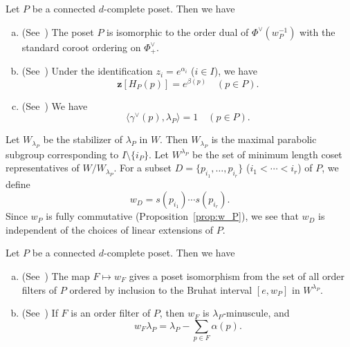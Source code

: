 \documentclass[ALCO,ThmDefs,Unicode,epreuves]{cedram}
\newcommand\vectz{\boldsymbol{z}}
\begin{document}
\begin{prop}
\label{prop:root}
Let $P$ be a connected $d$-complete poset. Then we have
\begin{enumerate}[(a)]
\item\label{prop2.10_a} %
\textup{(See~\cite[Proposition~3.1 and Theorem~5.5]{Stem2})}
The poset $P$ is isomorphic to the order dual of $\Phi^\vee(w_P^{-1})$ 
with the standard coroot ordering on $\Phi^\vee_+$.
\item\label{prop2.10_b} %
\textup{(See~\cite[Lemma~IV]{Proc3})}
Under the identification $z_i = e^{\alpha_i}$ \textup{(}$i \in I$\textup{)}, we have
$$
\vectz[H_P(p)] = e^{\beta(p)}
\quad(p \in P).
$$
\item\label{prop2.10_c} %
\textup{(See~\cite[Proposition~5.1]{Stem2})}
We have
$$
\langle \gamma^\vee(p), \lambda_P \rangle = 1
\quad(p \in P).
$$
\end{enumerate}
\end{prop}

Let $W_{\lambda_P}$ be the stabilizer of $\lambda_P$ in $W$.
Then $W_{\lambda_P}$ is the maximal parabolic subgroup corresponding to $I \setminus \{ i_P \}$.
Let $W^{\lambda_P}$ be the set of minimum length coset representatives of $W/W_{\lambda_P}$.
For a subset $D = \{ p_{i_1}, \ldots, p_{i_r} \}$ ($i_1 < \cdots < i_r$) of $P$, we define
\begin{equation}
\label{eq:w_D}
w_D = s(p_{i_1}) \cdots s(p_{i_r}).
\end{equation}
Since $w_P$ is fully commutative (Proposition~\ref{prop:w_P}), 
we see that $w_D$ is independent of the choices of linear extensions of $P$.

\begin{prop}
\label{prop:Weyl}
Let $P$ be a connected $d$-complete poset.
Then we have
\begin{enumerate}[(a)]
\item\label{prop2.11_a} %
\textup{(See~\cite[Proposition~I]{Proc3})}
The map $F \mapsto w_F$ gives a poset isomorphism 
from the set of all order filters of $P$ ordered by inclusion 
to the Bruhat interval $[e,w_P]$ in $W^{\lambda_P}$.
\item\label{prop2.11_b} %
\textup{(See~\cite[Remark~2.7~(b)]{Stem2})}
If $F$ is an order filter of $P$, then $w_F$ is $\lambda_P$-minuscule, and
$$
w_F \lambda_P = \lambda_P - \sum_{p \in F} \alpha(p).
$$
\end{enumerate}
\end{prop}
\end{document}
